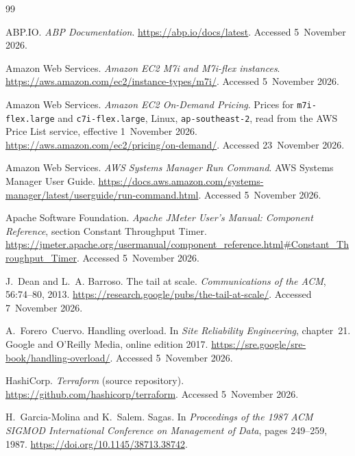 \documentclass[a4paper]{report}
\begin{document}
\begin{thebibliography}{99}
\raggedright

ABP.IO.
\newblock \emph{ABP Documentation}.
\newblock \url{https://abp.io/docs/latest}. Accessed 5~November 2026.

Amazon Web Services.
\newblock \emph{Amazon EC2 M7i and M7i-flex instances}.
\newblock \url{https://aws.amazon.com/ec2/instance-types/m7i/}. Accessed
5~November 2026.

Amazon Web Services.
\newblock \emph{Amazon EC2 On-Demand Pricing}. Prices for \texttt{m7i-flex.large}
and \texttt{c7i-flex.large}, Linux, \texttt{ap-southeast-2}, read from the AWS
Price List service, effective 1~November 2026.
\newblock \url{https://aws.amazon.com/ec2/pricing/on-demand/}. Accessed
23~November 2026.

Amazon Web Services.
\newblock \emph{AWS Systems Manager Run Command}. AWS Systems Manager User
Guide.
\newblock \url{https://docs.aws.amazon.com/systems-manager/latest/userguide/run-command.html}.
Accessed 5~November 2026.

Apache Software Foundation.
\newblock \emph{Apache JMeter User's Manual: Component Reference}, section
Constant Throughput Timer.
\newblock
\url{https://jmeter.apache.org/usermanual/component_reference.html#Constant_Throughput_Timer}.
Accessed 5~November 2026.

J.~Dean and L.~A. Barroso.
\newblock The tail at scale.
\newblock \emph{Communications of the ACM}, 56:74--80, 2013.
\newblock \url{https://research.google/pubs/the-tail-at-scale/}. Accessed 7~November 2026.

A.~Forero~Cuervo.
\newblock Handling overload.
\newblock In \emph{Site Reliability Engineering}, chapter~21. Google and
O'Reilly Media, online edition 2017.
\newblock \url{https://sre.google/sre-book/handling-overload/}. Accessed
5~November 2026.

HashiCorp.
\newblock \emph{Terraform} (source repository).
\newblock \url{https://github.com/hashicorp/terraform}. Accessed 5~November
2026.

H.~Garcia-Molina and K.~Salem.
\newblock Sagas.
\newblock In \emph{Proceedings of the 1987 ACM SIGMOD International Conference
on Management of Data}, pages 249--259, 1987.
\newblock \url{https://doi.org/10.1145/38713.38742}.


\end{thebibliography}
\end{document}
